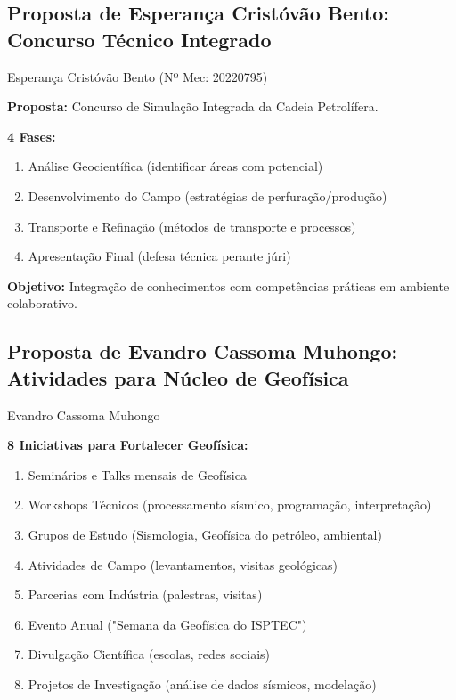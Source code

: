 \documentclass[12pt,a4paper,oneside]{article}
\begin{document}
\vspace{1.2cm}

\subsection{Proposta de Esperança Cristóvão Bento: Concurso Técnico Integrado}

\begin{proposalbox}{Esperança Cristóvão Bento (Nº Mec: 20220795)}

\textbf{Proposta:} Concurso de Simulação Integrada da Cadeia Petrolífera.

\medskip

\textbf{4 Fases:}
\begin{enumerate}
  \item Análise Geocientífica (identificar áreas com potencial)
  \item Desenvolvimento do Campo (estratégias de perfuração/produção)
  \item Transporte e Refinação (métodos de transporte e processos)
  \item Apresentação Final (defesa técnica perante júri)
\end{enumerate}

\medskip

\textbf{Objetivo:} Integração de conhecimentos com competências práticas em ambiente colaborativo.

\end{proposalbox}

\vspace{1.2cm}

\subsection{Proposta de Evandro Cassoma Muhongo: Atividades para Núcleo de Geofísica}

\begin{proposalbox}{Evandro Cassoma Muhongo}

\textbf{8 Iniciativas para Fortalecer Geofísica:}

\begin{enumerate}
  \item Seminários e Talks mensais de Geofísica
  \item Workshops Técnicos (processamento sísmico, programação, interpretação)
  \item Grupos de Estudo (Sismologia, Geofísica do petróleo, ambiental)
  \item Atividades de Campo (levantamentos, visitas geológicas)
  \item Parcerias com Indústria (palestras, visitas)
  \item Evento Anual ("Semana da Geofísica do ISPTEC")
  \item Divulgação Científica (escolas, redes sociais)
  \item Projetos de Investigação (análise de dados sísmicos, modelação)
\end{enumerate}

\end{proposalbox}
\end{document}
